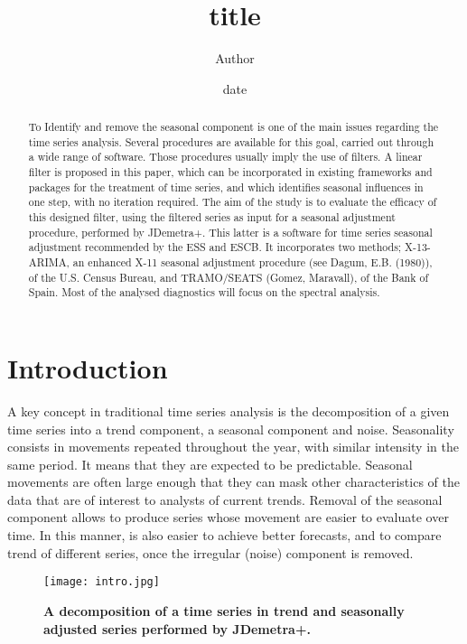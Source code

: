 \documentclass{article}
\title{title}
\author{Author}
\date{date}
\begin{document}
\maketitle
\newpage

\begin{abstract}
To Identify and remove the seasonal component is one of the main issues regarding the time series analysis. Several procedures are available for this goal, carried out through a wide range of software. Those procedures usually imply the use of filters.  A linear filter is proposed in this paper, which can be incorporated in existing frameworks and packages for the treatment of time series, and which identifies seasonal influences in one step, with no iteration required. The aim of the study is to evaluate the efficacy of this designed filter, using the filtered series as input for a seasonal adjustment procedure, performed by JDemetra+. This latter is a software for time series seasonal adjustment recommended by the ESS and ESCB. It incorporates two methods; X-13-ARIMA, an enhanced X-11 seasonal adjustment procedure (see Dagum, E.B. (1980)), of the U.S. Census Bureau, and TRAMO/SEATS (Gomez, Maravall), of the Bank of Spain. Most of the analysed diagnostics will focus on the spectral analysis.
\end{abstract}

\newpage

\section{Introduction}
A key concept in traditional time series analysis is the decomposition of a given time series into a trend component, a seasonal component and noise. Seasonality consists in movements repeated throughout the year, with similar intensity in the same period. It means that they are expected to be predictable. Seasonal movements are often large enough that they can mask other characteristics of the data that are of interest to analysts of current trends. Removal of the seasonal component allows to produce series whose movement are easier to evaluate over time. In this manner, is also easier to achieve better forecasts, and to compare trend of different series, once the irregular (noise) component is removed.\\

\begin{figure}[h]
  \texttt{[image: intro.jpg]}
  \caption{\textbf{\small A decomposition of a time series in trend and seasonally adjusted series performed by JDemetra+.}}
  \label{fig:1}
\end{figure}
\end{document}
